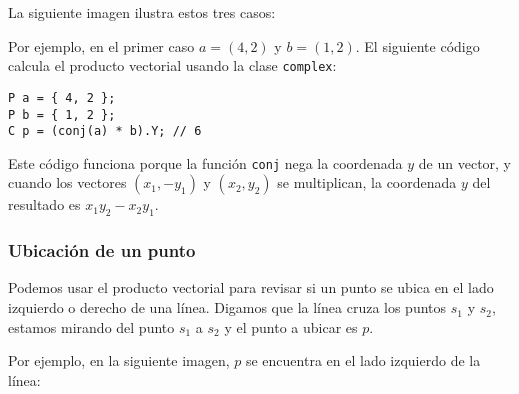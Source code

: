 La siguiente imagen ilustra estos tres casos:
\begin{center}
\end{center}

\noindent
Por ejemplo, en el primer caso $a=(4,2)$ y $b=(1,2)$. El siguiente código
calcula el producto vectorial usando la clase \texttt{complex}:

\begin{lstlisting}
P a = { 4, 2 };
P b = { 1, 2 };
C p = (conj(a) * b).Y; // 6
\end{lstlisting}

Este código funciona porque la función \texttt{conj} nega la coordenada $y$
de un vector, y cuando los vectores $(x_1,-y_1)$ y $(x_2,y_2)$ se multiplican,
la coordenada $y$ del resultado es $x_1 y_2 - x_2 y_1$.

\subsubsection{Ubicación de un punto}

Podemos usar el producto vectorial para revisar si un punto se ubica en
el lado izquierdo o derecho de una línea. Digamos que la línea cruza los puntos
$s_1$ y $s_2$, estamos mirando del punto $s_1$ a $s_2$ y el punto a ubicar
es $p$.

Por ejemplo, en la siguiente imagen, $p$ se encuentra en el lado izquierdo
de la línea:
\begin{center}
\end{center}

